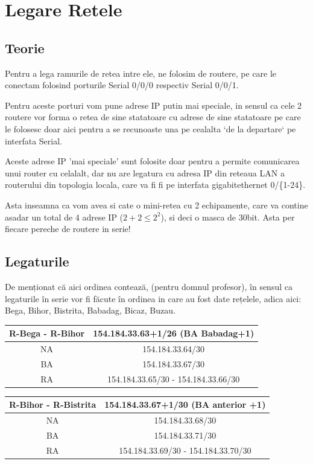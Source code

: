 \documentclass{article}
\begin{document}
\section{Legare Retele}
\subsection{Teorie}

Pentru a lega ramurile de retea intre ele, ne folosim de routere, pe care le conectam folosind porturile Serial 0/0/0 respectiv Serial 0/0/1.

Pentru aceste porturi vom pune adrese IP putin mai speciale, in sensul ca cele 2 routere vor forma o retea de sine statatoare cu adrese de sine statatoare pe care le folosesc doar aici pentru a se recunoaste una pe cealalta `de la departare` pe interfata Serial. 

Aceste adrese IP 'mai speciale' sunt folosite doar pentru a permite comunicarea unui router cu celalalt, dar nu are legatura cu adresa IP din reteaua LAN a routerului din topologia locala, care va fi fi pe interfata gigabitethernet 0/\{1-24\}.

Asta inseamna ca vom avea si cate o mini-retea cu 2 echipamente, care va contine asadar un total de 4 adrese IP ($2+2 \leq 2^{2}$), si deci o masca de 30bit. Asta per fiecare pereche de routere in serie!
\newpage

\subsection{Legaturile}
De menționat că aici ordinea contează, (pentru domnul profesor), în sensul ca legaturile în serie vor fi făcute în ordinea in care au fost date rețelele, adica aici: Bega, Bihor, Bistrita, Babadag, Bicaz, Buzau. 

\begin{center}
    \begin{tabular}{|c|c|}
    \hline
        R-Bega - R-Bihor & 154.184.33.63+1/26 (BA Babadag+1) \\
    \hline \hline
        NA &  154.184.33.64/30 \\
            \hline
        BA & 154.184.33.67/30\\
            \hline
        RA & 154.184.33.65/30 - 154.184.33.66/30 \\
            \hline
    \end{tabular}
\end{center}

\begin{center}
    \begin{tabular}{|c|c|}
    \hline
        R-Bihor - R-Bistrita& 154.184.33.67+1/30 (BA anterior +1) \\
    \hline \hline
        NA &  154.184.33.68/30 \\
            \hline
        BA & 154.184.33.71/30\\
            \hline
        RA & 154.184.33.69/30 - 154.184.33.70/30 \\
            \hline
    \end{tabular}
\end{center}
\end{document}
